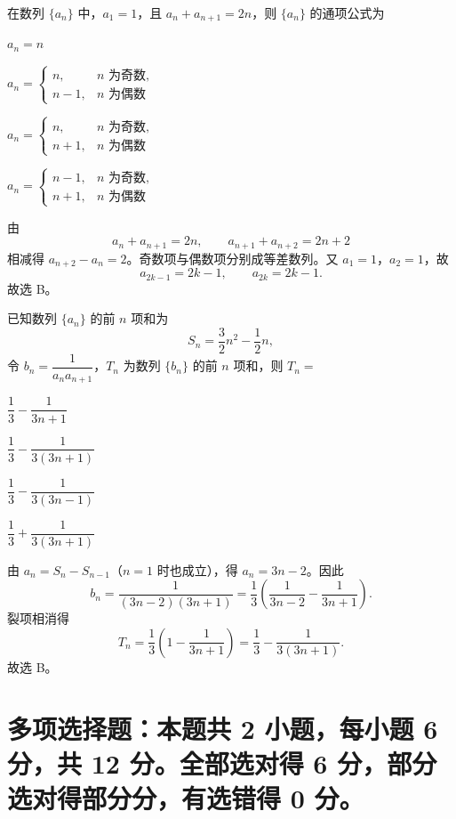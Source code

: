 \begin{question}[points=5]
在数列 $\{a_n\}$ 中，$a_1=1$，且 $a_n+a_{n+1}=2n$，则 $\{a_n\}$ 的通项公式为 \paren[B]
\begin{choices}
  \item $a_n=n$
  \item $a_n=\begin{cases}n,&n\text{ 为奇数},\\n-1,&n\text{ 为偶数}
  \end{cases}$
  \item $a_n=\begin{cases}n,&n\text{ 为奇数},\\n+1,&n\text{ 为偶数}
  \end{cases}$
  \item $a_n=\begin{cases}n-1,&n\text{ 为奇数},\\n+1,&n\text{ 为偶数}
  \end{cases}$
\end{choices}
\begin{solution}
由
\[
 a_n+a_{n+1}=2n,\qquad a_{n+1}+a_{n+2}=2n+2
\]
相减得 $a_{n+2}-a_n=2$。奇数项与偶数项分别成等差数列。又 $a_1=1$，$a_2=1$，故
\[
 a_{2k-1}=2k-1,\qquad a_{2k}=2k-1.
\]
故选 B。
\end{solution}
\end{question}

\begin{question}[points=5]
已知数列 $\{a_n\}$ 的前 $n$ 项和为
\[
 S_n=\frac32n^2-\frac12n,
\]
令 $b_n=\dfrac1{a_na_{n+1}}$，$T_n$ 为数列 $\{b_n\}$ 的前 $n$ 项和，则 $T_n=$ \paren[B]
\begin{choices}
  \item $\dfrac13-\dfrac1{3n+1}$
  \item $\dfrac13-\dfrac1{3(3n+1)}$
  \item $\dfrac13-\dfrac1{3(3n-1)}$
  \item $\dfrac13+\dfrac1{3(3n+1)}$
\end{choices}
\begin{solution}
由 $a_n=S_n-S_{n-1}$（$n=1$ 时也成立），得 $a_n=3n-2$。因此
\[
 b_n=\frac1{(3n-2)(3n+1)}
 =\frac13\left(\frac1{3n-2}-\frac1{3n+1}\right).
\]
裂项相消得
\[
 T_n=\frac13\left(1-\frac1{3n+1}\right)
 =\frac13-\frac1{3(3n+1)}.
\]
故选 B。
\end{solution}
\end{question}

\section{多项选择题：本题共 2 小题，每小题 6 分，共 12 分。全部选对得 6 分，部分选对得部分分，有选错得 0 分。}

